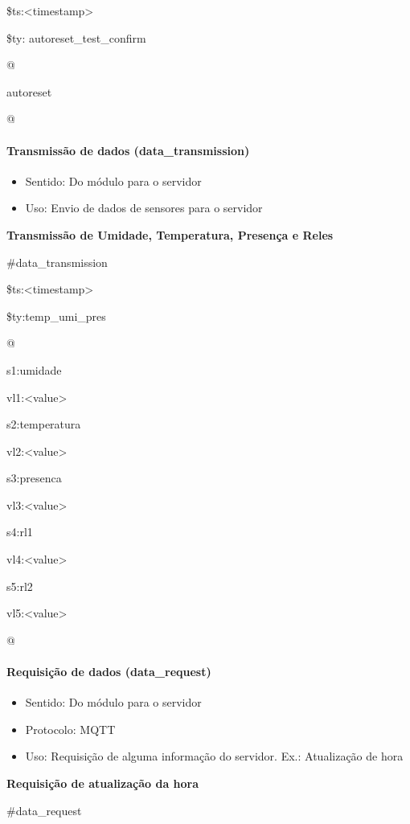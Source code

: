 \$ts:\textless timestamp\textgreater

\$ty: autoreset\_test\_confirm

@

autoreset

@

\paragraph{Transmissão de dados (data\_transmission)}
\begin{itemize}
\item Sentido: Do módulo para o servidor
\item Uso: Envio de dados de sensores para o servidor
\end{itemize}

\textbf{Transmissão de Umidade, Temperatura, Presença e Reles}

\#data\_transmission

\$ts:\textless timestamp\textgreater

\$ty:temp\_umi\_pres

@

s1:umidade

vl1:\textless value\textgreater

s2:temperatura

vl2:\textless value\textgreater

s3:presenca

vl3:\textless value\textgreater

s4:rl1

vl4:\textless value\textgreater

s5:rl2

vl5:\textless value\textgreater

@


\paragraph{Requisição de dados (data\_request)}
\begin{itemize}
\item Sentido: Do módulo para o servidor
\item Protocolo: MQTT
\item Uso: Requisição de alguma informação do servidor. Ex.: Atualização de hora
\end{itemize}

\textbf{Requisição de atualização da hora}

\#data\_request

